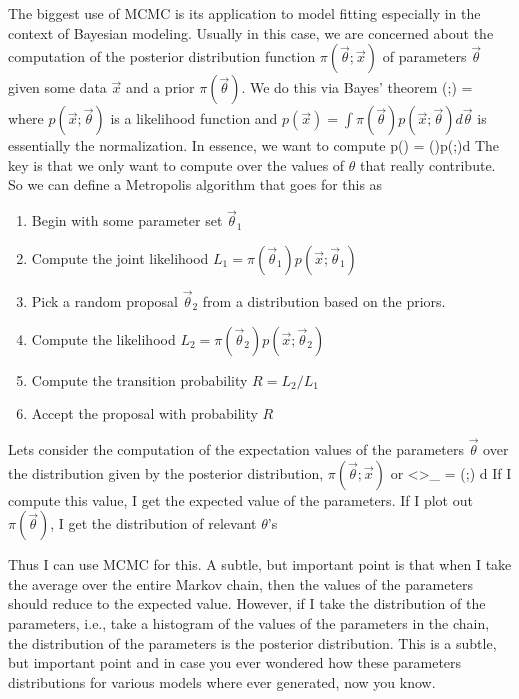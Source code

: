 The biggest use of MCMC is its application to model fitting especially in the context of Bayesian modeling.  Usually in this case, we are concerned about the computation of the posterior distribution function $\pi(\vec{\theta};\vec{x})$ of parameters $\vec{\theta}$ given some data $\vec{x}$ and a prior $\pi(\vec{\theta})$.  We do this via Bayes' theorem
\be
\pi(\vec{\theta};) = 
\ee
where $p(\vec{x};\vec{\theta})$ is a likelihood function and $p(\vec{x}) = \int \pi(\vec{\theta})p(\vec{x};\vec{\theta})d\vec{\theta}$ is essentially the normalization. In essence, we want to compute
\be
p() = \int \pi(\vec{\theta})p(;\vec{\theta})d\vec{\theta}
\ee
The key is that we only want to compute over the values of $\theta$ that really contribute.  So we can define a Metropolis algorithm that goes for this as
\begin{enumerate}
    \item Begin with some parameter set $\vec{\theta}_1$ 
    \item Compute the joint likelihood $L_1 = \pi(\vec{\theta}_1)p(\vec{x};\vec{\theta}_1)$
    \item Pick a random proposal $\vec{\theta}_2$ from a distribution based on the priors.
    \item Compute the likelihood $L_2 = \pi(\vec{\theta}_2)p(\vec{x};\vec{\theta}_2)$
    \item Compute the transition probability $R = L_2/L_1$
    \item Accept the proposal with probability $R$
\end{enumerate}

Lets consider the computation of the expectation values of the parameters $\vec{\theta}$ over the distribution given by the posterior distribution, $\pi(\vec{\theta};\vec{x})$ or
\be
\left<\vec{\theta}\right>_{\pi} = \int \vec{\theta}\pi(\vec{\theta};) d\vec{\theta} 
\ee
If I compute this value, I get the expected value of the parameters.  If I plot out $\pi(\vec{\theta})$, I get the distribution of relevant $\theta$'s 

Thus I can use MCMC for this.  A subtle, but important point is that when I take the average over the entire Markov chain, then the values of the parameters should reduce to the expected value.  However, if I take the distribution of the parameters, i.e., take a histogram of the values of the parameters in the chain, the distribution of the parameters is the posterior distribution.  This is a subtle, but important point and in case you ever wondered how these parameters distributions for various models where ever generated, now you know. 


